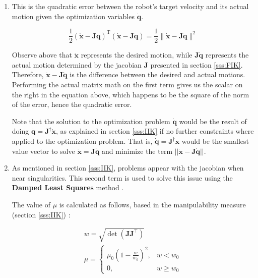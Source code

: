 \begin{enumerate}
    \item This is the quadratic error between the robot's target velocity and its actual motion given the optimization variables $\mathbf{\dot{q}}$.

    \begin{equation*}
            \frac{1}{2}\left(\mathbf{\dot{x}-J\dot{q}}\right)^{\mathrm{T}} \left(\mathbf{\dot{x}-J\dot{q}}\right) = \frac{1}{2}\|\mathbf{\dot{x}-J\dot{q}}\|^{2}
    \end{equation*}

    Observe above that $\mathbf{\dot{x}}$ represents the desired motion, while $\mathbf{J\dot{q}}$ represents the actual motion determined by the jacobian $\mathbf{J}$ presented in section \ref{sss:FIK}. Therefore, $\mathbf{\dot{x}-J\dot{q}}$ is the difference between the desired and actual motions. Performing the actual matrix math on the first term gives us the scalar on the right in the equation above, which happens to be the square of the norm of the error, hence the quadratic error.

    Note that the solution to the optimization problem $\dot{\mathbf{q}}$ would be the result of doing $\mathbf{\dot{q} = J^{\dagger} \dot{x}}$, as explained in section \ref{sss:IIK} if no further constraints where applied to the optimization problem. That is, $\mathbf{\dot{q}= J^{\dagger}\dot{x}}$ would be the smallest value vector to solve $\mathbf{\dot{x} = J\dot{q}}$ and minimize the term $||\mathbf{\dot{x} - J\dot{q}}||$.

    \item As mentioned in section \ref{sss:IIK}, problems appear with the jacobian when near singularities. This second term is used to solve this issue using the \textbf{Damped Least Squares} method \cite{nakamura1986inverse} \cite{wampler1986manipulator}.

    The value of $\mu$ is calculated as follows, based in the manipulability measure (section \ref{sss:IIK})
    :

    \begin{equation*}
        \begin{array}{l}
            w=\sqrt{\operatorname{det}\left(\mathbf{J} \mathbf{J}^{\top}\right)} \\
            \mu=\left\{\begin{array}{ll}
            \mu_{0}\left(1-\frac{w}{w_{0}}\right)^{2}, & w<w_{0} \\
            0, & w \geq w_{0}
            \end{array}\right.
        \end{array}
    \end{equation*}
\end{enumerate}

